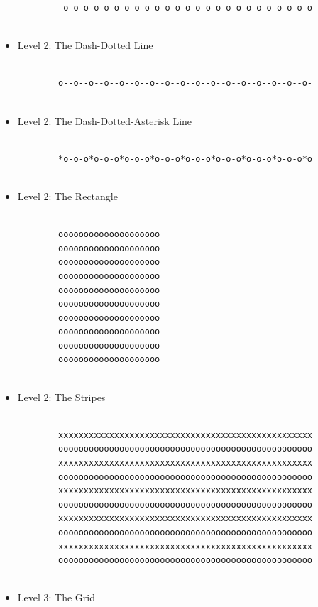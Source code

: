 \documentclass[12pt]{article}
\begin{document}
\begin{description}[labelindent=1cm]
\begin{itemize}
\begin{lstlisting}
		 o o o o o o o o o o o o o o o o o o o o o o o o o
		
		\end{lstlisting}
		
		\item Level 2: The Dash-Dotted Line
		
		\begin{lstlisting}
		
		o--o--o--o--o--o--o--o--o--o--o--o--o--o--o--o--o-
		
		\end{lstlisting}
		
		\item Level 2: The Dash-Dotted-Asterisk Line
		
		\begin{lstlisting}
		
		*o-o-o*o-o-o*o-o-o*o-o-o*o-o-o*o-o-o*o-o-o*o-o-o*o
		
		\end{lstlisting}
		
		\newpage
		\item Level 2: The Rectangle
		
		\begin{lstlisting}
		
		oooooooooooooooooooo
		oooooooooooooooooooo
		oooooooooooooooooooo
		oooooooooooooooooooo
		oooooooooooooooooooo
		oooooooooooooooooooo
		oooooooooooooooooooo
		oooooooooooooooooooo
		oooooooooooooooooooo
		oooooooooooooooooooo
		
		\end{lstlisting}
		
		\item Level 2: The Stripes
		
		\begin{lstlisting}
		
		xxxxxxxxxxxxxxxxxxxxxxxxxxxxxxxxxxxxxxxxxxxxxxxxxx
		oooooooooooooooooooooooooooooooooooooooooooooooooo
		xxxxxxxxxxxxxxxxxxxxxxxxxxxxxxxxxxxxxxxxxxxxxxxxxx
		oooooooooooooooooooooooooooooooooooooooooooooooooo
		xxxxxxxxxxxxxxxxxxxxxxxxxxxxxxxxxxxxxxxxxxxxxxxxxx
		oooooooooooooooooooooooooooooooooooooooooooooooooo
		xxxxxxxxxxxxxxxxxxxxxxxxxxxxxxxxxxxxxxxxxxxxxxxxxx
		oooooooooooooooooooooooooooooooooooooooooooooooooo
		xxxxxxxxxxxxxxxxxxxxxxxxxxxxxxxxxxxxxxxxxxxxxxxxxx
		oooooooooooooooooooooooooooooooooooooooooooooooooo
		
		\end{lstlisting}
		
	    \item Level 3: The Grid
		

\end{itemize}
\end{description}
\end{document}
